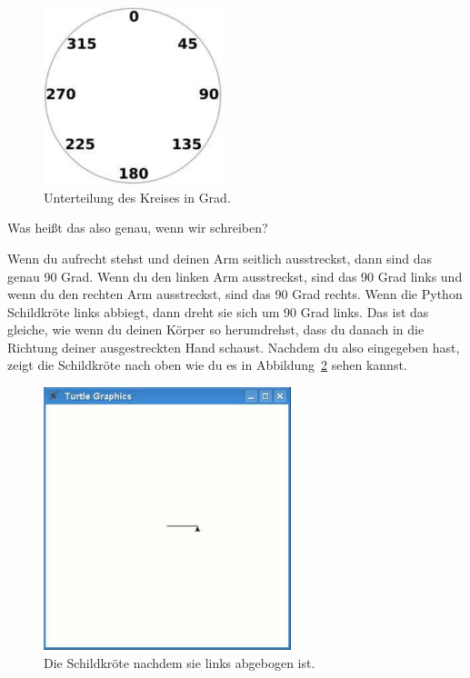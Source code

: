 \begin{figure}
\begin{center}
\includegraphics[width=52mm]{images/figure14}
\end{center}
\caption{Unterteilung des Kreises in Grad.}\label{fig14}
\end{figure}


Was heißt das also genau, wenn wir  schreiben?
\par
Wenn du aufrecht stehst und deinen Arm seitlich ausstreckst, dann sind das genau 90 Grad. Wenn du den linken Arm ausstreckst, sind das 90 Grad links und wenn du den rechten Arm ausstreckst, sind das 90 Grad rechts. Wenn die Python Schildkröte links abbiegt, dann dreht sie sich um 90 Grad links. Das ist das gleiche, wie wenn du deinen Körper so herumdrehst, dass du danach in die Richtung deiner ausgestreckten Hand schaust. Nachdem du also  eingegeben hast, zeigt die Schildkröte nach oben wie du es in Abbildung~\ref{fig15} sehen kannst.

\begin{figure}
\begin{center}
\includegraphics[width=72mm]{images/figure15}
\end{center}
\caption{Die Schildkröte nachdem sie links abgebogen ist.}\label{fig15}
\end{figure}

